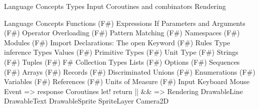 Language Concepts
Types
Input
Coroutines and combinators
Rendering


Language Concepts
  Functions (F#)
  Expressions
  If
  Parameters and Arguments (F#)
  Operator Overloading (F#)
  Pattern Matching (F#)
  Namespaces (F#)
  Modules (F#)
  Import Declarations: The open Keyword (F#)
  Rules
  Type inference
Types
  Values (F#)
  Primitive Types (F#)
  Unit Type (F#)
  Strings (F#)
  Tuples (F#)
  F# Collection Types
  Lists (F#)
  Options (F#)
  Sequences (F#)
  Arrays (F#)
  Records (F#)
  Discriminated Unions (F#)
  Enumerations (F#)
  Variables (F#)
  References (F#)
  Units of Measure (F#)
Input
  Keyboard
  Mouse
  Event => response
Coroutines
  let!
  return
  ||
  &&
  =>
Rendering
  DrawableLine
  DrawableText
  DrawableSprite
  SpriteLayer
  Camera2D

